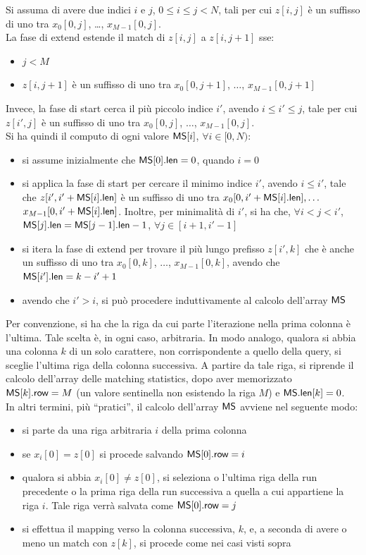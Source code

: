 Si assuma di avere due indici $i$ e $j$, $0\leq i\leq j< N$, tali per cui
$z[i,j]$ è un suffisso di uno tra $x_0[0,j]$, \ldots, $x_{M-1}[0,j]$. \\
La fase di extend estende il match di $z[i,j]$ a $z[i,j+1]$ sse:
\begin{itemize}
  \item $j<M$
  \item $z[i,j+1]$ è un suffisso di uno tra $x_0[0,j+1]$, $\ldots$,
  $x_{M-1}[0,j+1]$ 
\end{itemize}
Invece, la fase di start cerca il più piccolo indice $i'$,
avendo $i\leq i'\leq j$, tale per cui $z[i',j]$ è un suffisso di uno tra
$x_0[0,j]$, $\ldots$, $x_{M-1}[0,j]$.\\
Si ha quindi il computo di ogni valore $\mbox{\rm {\sf MS}}[i]$, $\forall i\in[0,N)$:
\begin{itemize}
  \item si assume inizialmente che $\mbox{\rm {\sf MS}}[0].\mbox{\rm {\sf len}}=0$, quando $i=0$
  \item si applica la fase di start per cercare il minimo indice
  $i'$, avendo $i\leq i'$, tale che $z[i',i'+\mbox{\rm {\sf MS}}[i].\mbox{\rm {\sf len}}]$ è un suffisso di uno
  tra $x_0[0,i'+\mbox{\rm {\sf MS}}[i].\mbox{\rm {\sf len}}], \ldots$ $x_{M-1}[0,i'+\mbox{\rm {\sf MS}}[i].\mbox{\rm {\sf len}}]$. Inoltre, per
  minimalità di $i'$, si ha che, $\forall i<j<i'$,
  $\mbox{\rm {\sf MS}}[j].\mbox{\rm {\sf len}}=\mbox{\rm {\sf MS}}[j-1].\mbox{\rm {\sf len}}-1$, $\forall j\in[i+1,i'-1]$
  \item si itera la fase di extend per trovare il
  più lungo prefisso $z[i',k]$ che è anche un suffisso di uno tra $x_0[0,k]$,
  $\ldots$, $x_{M-1}[0,k]$, avendo che $\mbox{\rm {\sf MS}}[i'].\mbox{\rm {\sf len}}=k-i'+1$
  \item avendo che $i'>i$, si può procedere induttivamente al calcolo dell'array
  $\mbox{\rm {\sf MS}}$ 
\end{itemize}
Per convenzione, si ha che la riga da cui parte l'iterazione nella prima colonna
è l'ultima. Tale scelta è, in ogni caso, arbitraria.
In modo
analogo, qualora si abbia una colonna $k$ di un solo carattere, non
corrispondente a quello della query, si sceglie l'ultima riga della
colonna successiva. A partire da tale riga, si riprende il calcolo 
dell'array delle matching statistics, dopo aver memorizzato $\mbox{\rm {\sf MS}}[k].\mbox{\rm {\sf row}}=M$
(un valore sentinella non esistendo la riga $M$) e $\mbox{\rm {\sf MS}}.\mbox{\rm {\sf len}}[k]=0$.\\
In altri termini, più ``pratici'', il calcolo dell'array $\mbox{\rm {\sf MS}}$ avviene nel
seguente modo:
\begin{itemize}
  \item si parte da una riga arbitraria $i$ della prima colonna
  \item se $x_i[0]=z[0]$ si procede salvando $\mbox{\rm {\sf MS}}[0].\mbox{\rm {\sf row}}=i$
  \item qualora si abbia $x_i[0]\neq z[0]$, si seleziona o l'ultima riga della
  run precedente o la prima riga della run successiva a quella a cui appartiene
  la riga $i$. Tale riga verrà salvata come $\mbox{\rm {\sf MS}}[0].\mbox{\rm {\sf row}}=j$
  \item si effettua il mapping verso la colonna successiva, $k$,
  e, a seconda di avere o meno un match con $z[k]$, si procede come nei casi
  visti sopra 
\end{itemize}
